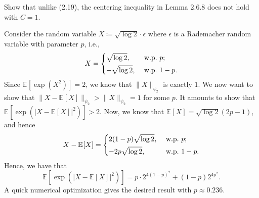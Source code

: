 \begin{problem*}[Exercise 2.6.9]\label{ex2.6.9}
	Show that unlike (2.19), the centering inequality in Lemma 2.6.8 does not hold with \(C = 1\).
\end{problem*}
\begin{answer}
	Consider the random variable \(X \coloneqq \sqrt{\log 2} \cdot \epsilon \) where \(\epsilon \) is a Rademacher random variable with parameter \(p\), i.e.,
	\[
		X = \begin{dcases}
			\sqrt{\log 2} ,  & \text{ w.p.\ }p  ;     \\
			-\sqrt{\log 2} , & \text{ w.p.\ } 1 - p .
		\end{dcases}
	\]
	Since \(\mathbb{E}_{}[\exp (X^2)] = 2\), we know that \(\lVert X \rVert _{\psi _2}\) is exactly \(1\). We now want to show that \(\lVert X - \mathbb{E}_{}[X] \rVert _{\psi _2} > \lVert X \rVert _{\psi _2} = 1\) for some \(p\). It amounts to show that \(\mathbb{E}_{}[\exp (\vert X - \mathbb{E}_{}[X] \vert ^2 )] > 2\). Now, we know that \(\mathbb{E}_{}[X] = \sqrt{\log 2} (2p - 1) \), and hence
	\[
		X - \mathbb{E}_{}[X] = \begin{dcases}
			2 (1 - p) \sqrt{\log 2} , & \text{ w.p.\ } p ;    \\
			-2p \sqrt{\log 2} ,       & \text{ w.p.\ } 1 - p.
		\end{dcases}
	\]
	Hence, we have that
	\[
		\mathbb{E}_{}[\exp (\vert X - \mathbb{E}_{}[X] \vert ^2 )]
		= p\cdot 2^{4(1 - p)^2} + (1 - p) 2^{4p^2}.
	\]
	A quick numerical optimization gives the desired result with \(p \approx 0.236\).
\end{answer}